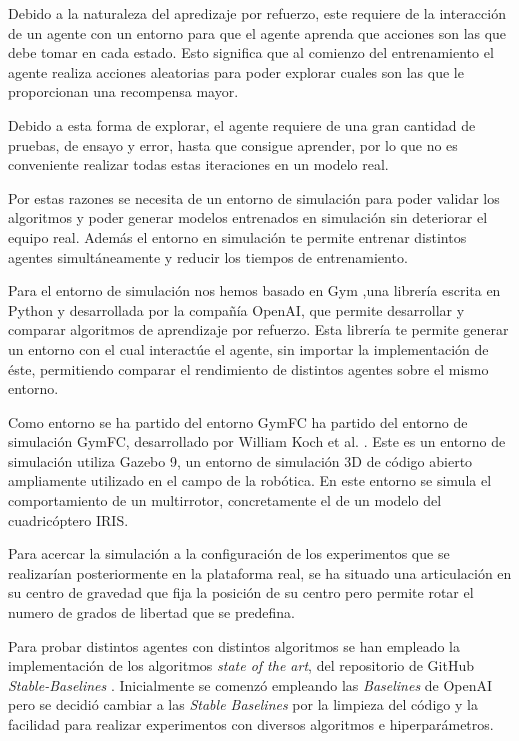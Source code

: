 Debido a la naturaleza del apredizaje por refuerzo, este requiere de la interacción de un agente con un entorno para que el agente aprenda que acciones son las que debe tomar en cada estado. Esto significa que al comienzo del entrenamiento el agente realiza acciones aleatorias para poder explorar cuales son las que le proporcionan una recompensa mayor.

Debido a esta forma de explorar, el agente requiere de una gran cantidad de pruebas, de ensayo y error, hasta que consigue aprender, por lo que no es conveniente realizar todas estas iteraciones en un modelo real.

Por estas razones se necesita de un entorno de simulación para poder validar los algoritmos y poder generar modelos entrenados en simulación sin deteriorar el equipo real. Además el entorno en simulación te permite entrenar distintos agentes simultáneamente y reducir los tiempos de entrenamiento.

Para el entorno de simulación nos hemos basado en Gym ,una librería escrita en Python y desarrollada por la compañía OpenAI, que permite desarrollar y comparar algoritmos de aprendizaje por refuerzo. Esta librería te permite generar un entorno con el cual interactúe el agente, sin importar la implementación de éste, permitiendo comparar el rendimiento de distintos agentes sobre el mismo entorno.

Como entorno se ha partido del entorno GymFC ha partido del entorno de simulación GymFC, desarrollado por William Koch et al. \cite{koch2019reinforcement}.
Este es un entorno de simulación utiliza Gazebo 9, un entorno de simulación 3D de código abierto ampliamente utilizado en el campo de la robótica. En este entorno se simula el comportamiento de un multirrotor, concretamente el de un modelo del cuadricóptero IRIS.

Para acercar la simulación a la configuración de los experimentos que se realizarían posteriormente en la plataforma real, se ha situado una articulación en su centro de gravedad que fija la posición de su centro pero permite rotar el numero de grados de libertad que se predefina.
 
Para probar distintos agentes con distintos algoritmos se han empleado la implementación de los algoritmos \textit{state of the art}, del repositorio de GitHub \textit{Stable-Baselines} \cite{stable-baselines}. Inicialmente se comenzó empleando las \textit{Baselines} de OpenAI \cite{OpenAIbaselines} pero se decidió cambiar a las \textit{Stable Baselines} por la limpieza del código y la facilidad para realizar experimentos con diversos algoritmos e hiperparámetros.
\\

